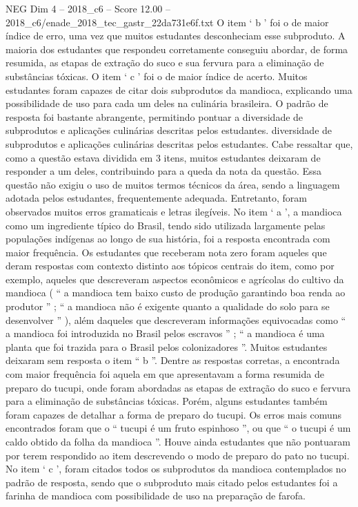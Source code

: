 \begin{textsample}{NEG Dim 4 – 2018\_c6 – Score 12.00 – 2018\_c6/enade\_2018\_tec\_gastr\_22da731e6f.txt}
O item ‘ b ’ foi o de maior índice de erro, uma vez que muitos estudantes desconheciam esse subproduto.
A maioria dos estudantes que respondeu corretamente conseguiu abordar, de forma resumida, as etapas de extração do suco e sua fervura para a eliminação de substâncias tóxicas.
O item ‘ c ’ foi o de maior índice de acerto.
Muitos estudantes foram capazes de citar dois subprodutos da mandioca, explicando uma possibilidade de uso para cada um deles na culinária brasileira.
O padrão de resposta foi bastante abrangente, permitindo pontuar a diversidade de subprodutos e aplicações culinárias descritas pelos estudantes. diversidade de subprodutos e aplicações culinárias descritas pelos estudantes.
Cabe ressaltar que, como a questão estava dividida em 3 itens, muitos estudantes deixaram de responder a um deles, contribuindo para a queda da nota da questão.
Essa questão não exigiu o uso de muitos termos técnicos da área, sendo a linguagem adotada pelos estudantes, frequentemente adequada.
Entretanto, foram observados muitos erros gramaticais e letras ilegíveis.
No item ‘ a ’, a mandioca como um ingrediente típico do Brasil, tendo sido utilizada largamente pelas populações indígenas ao longo de sua história, foi a resposta encontrada com maior frequência.
Os estudantes que receberam nota zero foram aqueles que deram respostas com contexto distinto aos tópicos centrais do item, como por exemplo, aqueles que descreveram aspectos econômicos e agrícolas do cultivo da mandioca ( “ a mandioca tem baixo custo de produção garantindo boa renda ao produtor ” ; “ a mandioca não é exigente quanto a qualidade do solo para se desenvolver ” ), além daqueles que descreveram informações equivocadas como “ a mandioca foi introduzida no Brasil pelos escravos ” ; “ a mandioca é uma planta que foi trazida para o Brasil pelos colonizadores ”.
Muitos estudantes deixaram sem resposta o item “ b ”.
Dentre as respostas corretas, a encontrada com maior frequência foi aquela em que apresentavam a forma resumida de preparo do tucupi, onde foram abordadas as etapas de extração do suco e fervura para a eliminação de substâncias tóxicas.
Porém, alguns estudantes também foram capazes de detalhar a forma de preparo do tucupi.
Os erros mais comuns encontrados foram que o “ tucupi é um fruto espinhoso ”, ou que “ o tucupi é um caldo obtido da folha da mandioca ”.
Houve ainda estudantes que não pontuaram por terem respondido ao item descrevendo o modo de preparo do pato no tucupi.
No item ‘ c ’, foram citados todos os subprodutos da mandioca contemplados no padrão de resposta, sendo que o subproduto mais citado pelos estudantes foi a farinha de mandioca com possibilidade de uso na preparação de farofa.

\end{textsample}
